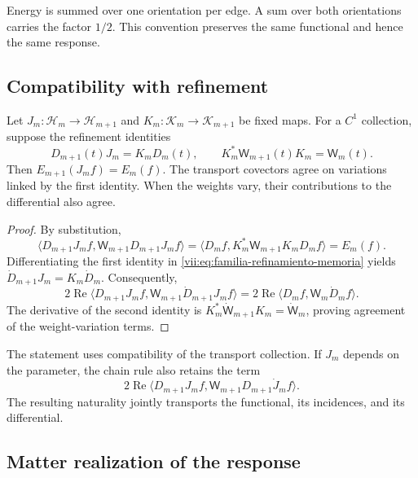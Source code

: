 Energy is summed over one orientation per edge. A sum over both
orientations carries the factor \(1/2\). This convention preserves the same
functional and hence the same response.

\subsection{Compatibility with refinement}
\label{vii:subsec:refinamiento-respuesta}

\begin{theorem}
\label{vii:thm:refinamiento-respuesta}
Let \(J_m:\mathcal H_m\to\mathcal H_{m+1}\) and
\(K_m:\mathcal K_m\to\mathcal K_{m+1}\) be fixed maps.
For a \(C^1\) collection, suppose the refinement identities
\begin{equation}
 D_{m+1}(t)J_m=K_mD_m(t),\qquad
 K_m^*\mathsf W_{m+1}(t)K_m=\mathsf W_m(t).
 \label{vii:eq:familia-refinamiento-memoria}
\end{equation}
Then \(E_{m+1}(J_mf)=E_m(f)\).
The transport covectors agree on variations linked by
the first identity. When the weights vary, their contributions
to the differential also agree.
\end{theorem}

\begin{proof}
By substitution,
\[
 \langle D_{m+1}J_mf,\mathsf W_{m+1}D_{m+1}J_mf\rangle
 =\langle D_mf,K_m^*\mathsf W_{m+1}K_mD_mf\rangle=E_m(f).
\]
Differentiating the first identity in
\eqref{vii:eq:familia-refinamiento-memoria} yields
\(\dot D_{m+1}J_m=K_m\dot D_m\). Consequently,
\[
 2\operatorname{Re}
 \langle D_{m+1}J_mf,\mathsf W_{m+1}\dot D_{m+1}J_mf\rangle
 =2\operatorname{Re}\langle D_mf,\mathsf W_m\dot D_mf\rangle.
\]
The derivative of the second identity is
\(K_m^*\dot{\mathsf W}_{m+1}K_m=\dot{\mathsf W}_m\), proving
agreement of the weight-variation terms.
\end{proof}

The statement uses compatibility of the transport collection.
If \(J_m\) depends on the parameter, the chain rule also retains
the term
\[
 2\operatorname{Re}
 \langle D_{m+1}J_mf,\mathsf W_{m+1}D_{m+1}\dot J_mf\rangle.
\]
The resulting naturality jointly transports the functional, its
incidences, and its differential.

\subsection{Matter realization of the response}
\label{vii:subsec:realizacion-respuesta-discreta}

